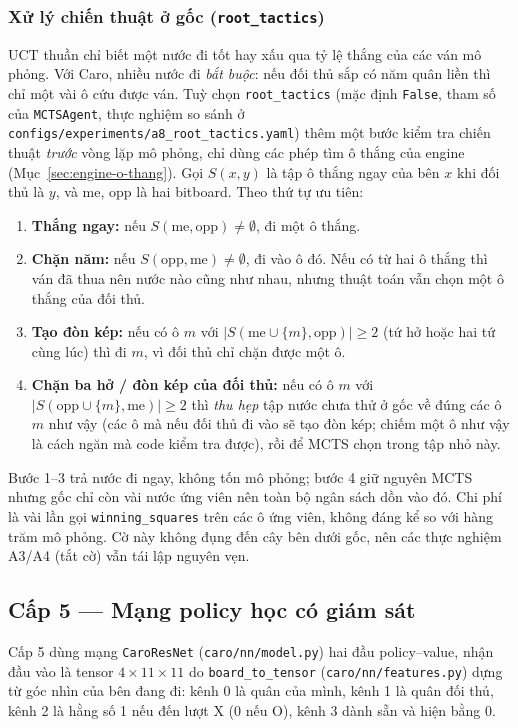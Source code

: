 \subsubsection{Xử lý chiến thuật ở gốc (\texttt{root\_tactics})}
\label{sec:root-tactics}
UCT thuần chỉ biết một nước đi tốt hay xấu qua tỷ lệ thắng của các ván mô phỏng. Với Caro, nhiều nước đi \emph{bắt buộc}: nếu đối thủ sắp có năm quân liền thì chỉ một vài ô cứu được ván. Tuỳ chọn \texttt{root\_tactics} (mặc định \texttt{False}, tham số của \texttt{MCTSAgent}, thực nghiệm so sánh ở \texttt{configs/experiments/a8\_root\_tactics.yaml}) thêm một bước kiểm tra chiến thuật \emph{trước} vòng lặp mô phỏng, chỉ dùng các phép tìm ô thắng của engine (Mục~\ref{sec:engine-o-thang}). Gọi $S(x, y)$ là tập ô thắng ngay của bên $x$ khi đối thủ là $y$, và $\text{me}$, $\text{opp}$ là hai bitboard. Theo thứ tự ưu tiên:
\begin{enumerate}
  \item \textbf{Thắng ngay:} nếu $S(\text{me}, \text{opp}) \neq \emptyset$, đi một ô thắng.
  \item \textbf{Chặn năm:} nếu $S(\text{opp}, \text{me}) \neq \emptyset$, đi vào ô đó. Nếu có từ hai ô thắng thì ván đã thua nên nước nào cũng như nhau, nhưng thuật toán vẫn chọn một ô thắng của đối thủ.
  \item \textbf{Tạo đòn kép:} nếu có ô $m$ với $|S(\text{me} \cup \{m\}, \text{opp})| \geq 2$ (tứ hở hoặc hai tứ cùng lúc) thì đi $m$, vì đối thủ chỉ chặn được một ô.
  \item \textbf{Chặn ba hở / đòn kép của đối thủ:} nếu có ô $m$ với $|S(\text{opp} \cup \{m\}, \text{me})| \geq 2$ thì \emph{thu hẹp} tập nước chưa thử ở gốc về đúng các ô $m$ như vậy (các ô mà nếu đối thủ đi vào sẽ tạo đòn kép; chiếm một ô như vậy là cách ngăn mà code kiểm tra được), rồi để MCTS chọn trong tập nhỏ này.
\end{enumerate}
Bước 1--3 trả nước đi ngay, không tốn mô phỏng; bước 4 giữ nguyên MCTS nhưng gốc chỉ còn vài nước ứng viên nên toàn bộ ngân sách dồn vào đó. Chi phí là vài lần gọi \texttt{winning\_squares} trên các ô ứng viên, không đáng kể so với hàng trăm mô phỏng. Cờ này không đụng đến cây bên dưới gốc, nên các thực nghiệm A3/A4 (tắt cờ) vẫn tái lập nguyên vẹn.

\subsection{Cấp 5 --- Mạng policy học có giám sát}
Cấp 5 dùng mạng \texttt{CaroResNet} (\texttt{caro/nn/model.py}) hai đầu policy--value, nhận đầu vào là tensor $4\times 11\times 11$ do \texttt{board\_to\_tensor} (\texttt{caro/nn/features.py}) dựng từ góc nhìn của bên đang đi: kênh 0 là quân của mình, kênh 1 là quân đối thủ, kênh 2 là hằng số 1 nếu đến lượt X (0 nếu O), kênh 3 dành sẵn và hiện bằng 0.

